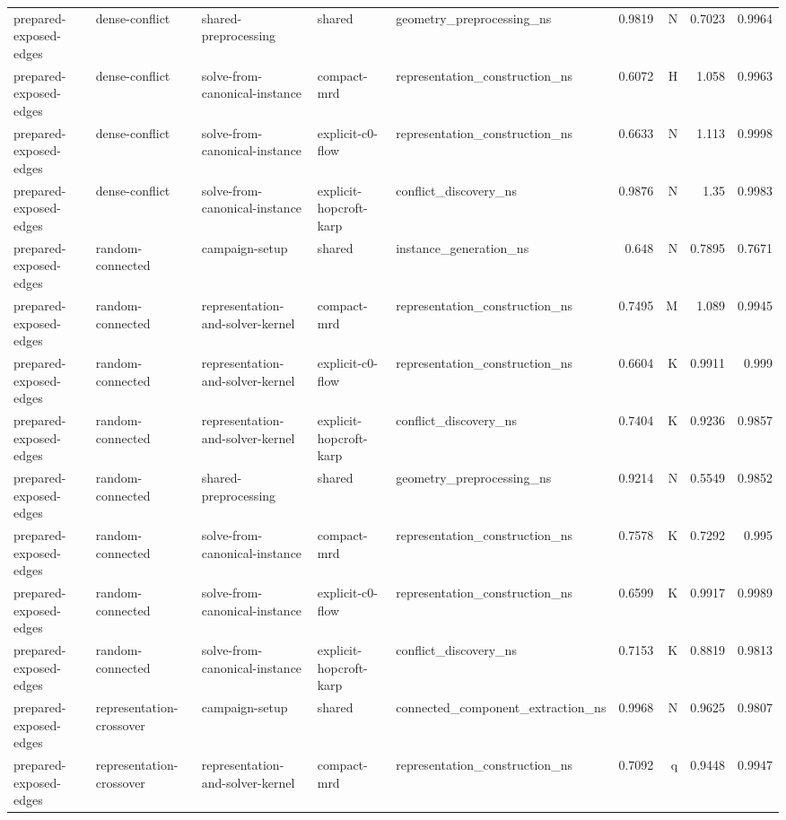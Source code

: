 \begin{table}[t]
\begin{tabular}{lllllrrrr}
prepared-exposed-edges & dense-conflict & shared-preprocessing & shared & geometry\_preprocessing\_ns & 0.9819 & N & 0.7023 & 0.9964 \\
prepared-exposed-edges & dense-conflict & solve-from-canonical-instance & compact-mrd & representation\_construction\_ns & 0.6072 & H & 1.058 & 0.9963 \\
prepared-exposed-edges & dense-conflict & solve-from-canonical-instance & explicit-c0-flow & representation\_construction\_ns & 0.6633 & N & 1.113 & 0.9998 \\
prepared-exposed-edges & dense-conflict & solve-from-canonical-instance & explicit-hopcroft-karp & conflict\_discovery\_ns & 0.9876 & N & 1.35 & 0.9983 \\
prepared-exposed-edges & random-connected & campaign-setup & shared & instance\_generation\_ns & 0.648 & N & 0.7895 & 0.7671 \\
prepared-exposed-edges & random-connected & representation-and-solver-kernel & compact-mrd & representation\_construction\_ns & 0.7495 & M & 1.089 & 0.9945 \\
prepared-exposed-edges & random-connected & representation-and-solver-kernel & explicit-c0-flow & representation\_construction\_ns & 0.6604 & K & 0.9911 & 0.999 \\
prepared-exposed-edges & random-connected & representation-and-solver-kernel & explicit-hopcroft-karp & conflict\_discovery\_ns & 0.7404 & K & 0.9236 & 0.9857 \\
prepared-exposed-edges & random-connected & shared-preprocessing & shared & geometry\_preprocessing\_ns & 0.9214 & N & 0.5549 & 0.9852 \\
prepared-exposed-edges & random-connected & solve-from-canonical-instance & compact-mrd & representation\_construction\_ns & 0.7578 & K & 0.7292 & 0.995 \\
prepared-exposed-edges & random-connected & solve-from-canonical-instance & explicit-c0-flow & representation\_construction\_ns & 0.6599 & K & 0.9917 & 0.9989 \\
prepared-exposed-edges & random-connected & solve-from-canonical-instance & explicit-hopcroft-karp & conflict\_discovery\_ns & 0.7153 & K & 0.8819 & 0.9813 \\
prepared-exposed-edges & representation-crossover & campaign-setup & shared & connected\_component\_extraction\_ns & 0.9968 & N & 0.9625 & 0.9807 \\
prepared-exposed-edges & representation-crossover & representation-and-solver-kernel & compact-mrd & representation\_construction\_ns & 0.7092 & q & 0.9448 & 0.9947 \\

\end{tabular}
\end{table}
